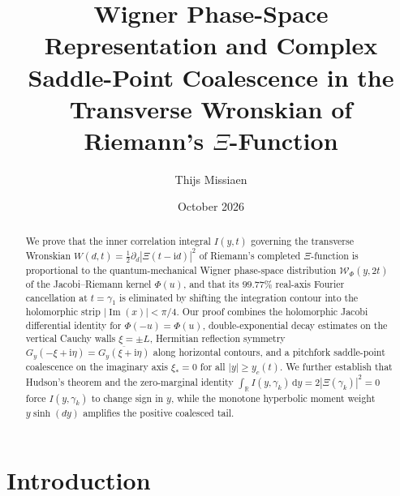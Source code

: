 \documentclass[11pt,a4paper,reqno]{amsart}
\title[Wigner Phase-Space and Saddle Coalescence in Riemann's $\Xi$-Function]{Wigner Phase-Space Representation and Complex Saddle-Point Coalescence in the Transverse Wronskian of Riemann's $\Xi$-Function}
\author{Thijs Missiaen}
\date{October 2026}
\theoremstyle{definition}
\theoremstyle{remark}
\numberwithin{equation}{section}
\newcommand{\dd}{\mathrm{d}}
\newcommand{\ii}{\mathrm{i}}
\newcommand{\Ima}{\operatorname{Im}}
\newcommand{\Wig}{\mathcal{W}}
\begin{document}
\begin{abstract}
We prove that the inner correlation integral $I(y,t)$ governing the transverse Wronskian $W(d,t) = \frac{1}{2}\partial_d|\Xi(t-\ii d)|^2$ of Riemann's completed $\Xi$-function is proportional to the quantum-mechanical Wigner phase-space distribution $\Wig_\Phi(y,2t)$ of the Jacobi--Riemann kernel $\Phi(u)$, and that its $99.77\%$ real-axis Fourier cancellation at $t=\gamma_1$ is eliminated by shifting the integration contour into the holomorphic strip $|\Ima(x)| < \pi/4$. Our proof combines the holomorphic Jacobi differential identity for $\Phi(-u)=\Phi(u)$, double-exponential decay estimates on the vertical Cauchy walls $\xi = \pm L$, Hermitian reflection symmetry $G_y(-\xi+\ii\eta) = \overline{G_y(\xi+\ii\eta)}$ along horizontal contours, and a pitchfork saddle-point coalescence on the imaginary axis $\xi_* = 0$ for all $|y| \ge y_c(t)$. We further establish that Hudson's theorem and the zero-marginal identity $\int_{\mathbb{R}} I(y,\gamma_k)\,\dd y = 2|\Xi(\gamma_k)|^2 = 0$ force $I(y,\gamma_k)$ to change sign in $y$, while the monotone hyperbolic moment weight $y\sinh(d y)$ amplifies the positive coalesced tail.
\end{abstract}

\maketitle

\section{Introduction}\label{sec:intro}
\end{document}
